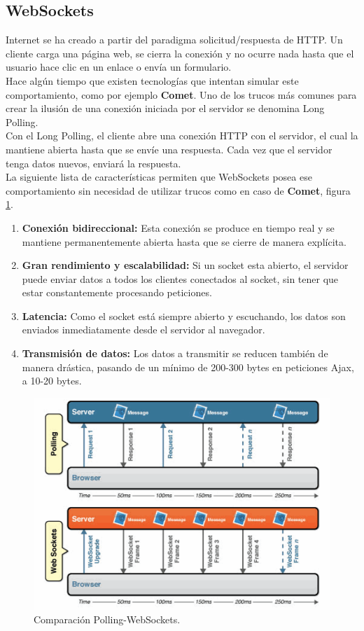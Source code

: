 \subsection{WebSockets}
Internet se ha creado a partir del paradigma solicitud/respuesta de HTTP. Un cliente carga una página web, se cierra la conexión y no ocurre nada hasta que el usuario hace clic en un enlace o envía un formulario.
\\Hace algún tiempo que existen tecnologías que intentan simular este comportamiento, como por ejemplo \textbf{Comet}. Uno de los trucos más comunes para crear la ilusión de una conexión iniciada por el servidor se denomina Long Polling. \\Con el Long Polling, el cliente abre una conexión HTTP con el servidor, el cual la mantiene abierta hasta que se envíe una respuesta. Cada vez que el servidor tenga datos nuevos, enviará la respuesta.
\\La siguiente lista de características permiten que WebSockets\cite{Websockets} posea ese comportamiento sin necesidad de utilizar trucos como en caso de \textbf{Comet}, figura \ref{fig:websocketsDiag}.
\begin{enumerate}
\item \textbf{Conexión bidireccional:} Esta conexión se produce en tiempo real y se mantiene permanentemente abierta hasta que se cierre de manera explícita.
\item \textbf{Gran rendimiento y escalabilidad:} Si un socket esta abierto, el servidor puede enviar datos a todos los clientes conectados al socket, sin tener que estar constantemente procesando peticiones.
\item \textbf{Latencia:} Como el socket está siempre abierto y escuchando, los datos son enviados inmediatamente desde el servidor al navegador.
\item \textbf{Transmisión de datos:} Los datos a transmitir se reducen también de manera drástica, pasando de un mínimo de 200-300 bytes en peticiones Ajax, a 10-20 bytes.
\end{enumerate}
\begin{figure}[!h]
\begin{center}
   \includegraphics[width=0.5\linewidth]{Figures/websocketsDiag}
	\decoRule
	\caption[Comparación Polling-WebSockets]{Comparación Polling-WebSockets.}
\label{fig:websocketsDiag}
\end{center}
\end{figure}

